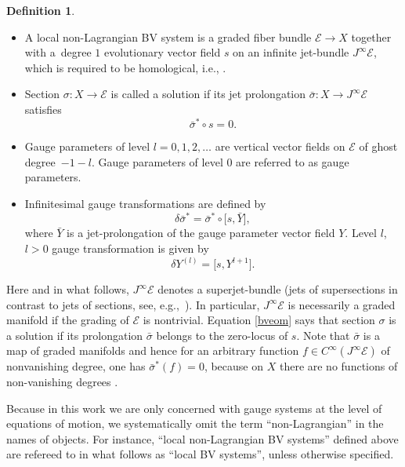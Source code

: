 \documentclass[10pt,a4paper]{amsart}
\numberwithin{equation}{section}
\theoremstyle{definition}
\newtheorem{Definition}[Theorem]{Definition}
\newcommand{\commut}[2]{[#1{,}\,#2]}
\newcommand{\half}{\mathchoice{%
 \ffrac{1}{2}}{\frac{1}{2}}{\frac{1}{2}}{\frac{1}{2}}}
\newcommand{\ffrac}[2]{\raisebox{.5pt}%
 {\footnotesize$\displaystyle\frac{#1}{#2}$}\kern1pt}
\def\cE{\mathcal{E}}
\begin{document}
\begin{Definition}%
\quad
\begin{itemize}\itemsep=0pt
\item
 A local non-Lagrangian BV system is a graded fiber bundle $\mathcal{E}\rightarrow X$ together with a~degree $1$ evolutionary vector field $s$ on an infinite jet-bundle $J^{\infty}\mathcal{E}$, which is required to be homological, i.e., \smash{$s^2=\half\commut{s}{s}=0$}.

 \item Section $\sigma\colon X\rightarrow \mathcal{E}$ is called a solution if its jet prolongation $\bar{\sigma}\colon X\rightarrow J^{\infty}\mathcal{E}$ satisfies
 \begin{equation}\label{bveom}
 \bar{\sigma}^*\circ s=0.
 \end{equation}

\item Gauge parameters of level $l=0,1,2,\dots$ are vertical vector fields on $\mathcal{E}$ of ghost degree~${-1-l}$. Gauge parameters of level $0$ are referred to as gauge parameters.

\item Infinitesimal gauge transformations are defined by
 \begin{equation*}%
 \delta\bar{\sigma}^*=\bar{\sigma}^*\circ\bigl[s, \bar Y\bigr],
 \end{equation*}
 where $\bar{Y}$ is a jet-prolongation of the gauge parameter vector field $Y$. Level $l$, $l>0$ gauge transformation is given by
 \begin{equation*}
 \delta Y^{(l)}=\bigl[s,Y^{l+1}\bigr].
 \end{equation*}
\end{itemize}
\end{Definition}
Here and in what follows, $J^{\infty}\cE$ denotes a superjet-bundle (jets of supersections in contrast to jets of sections, see, e.g.,~\cite{bonavolonta2013}). In particular, $J^{\infty}\cE$ is necessarily a graded manifold if the grading of $\cE$ is nontrivial. Equation \eqref{bveom} says that section $\sigma$ is a solution if its prolongation $\bar\sigma$ belongs to the zero-locus of $s$. Note that $\bar{\sigma}$ is a map of graded manifolds and hence for an arbitrary function $f\in C^{\infty}(J^{\infty}\mathcal{E})$ of nonvanishing degree, one has $\bar{\sigma}^*(f)=0$, because on $X$ there are no functions of non-vanishing degrees .

Because in this work we are only concerned with gauge systems at the level of equations of motion, we systematically omit the term ``non-Lagrangian'' in the names of objects. For instance, ``local non-Lagrangian BV systems'' defined above are refereed to in what follows as ``local BV systems'', unless otherwise specified.
\end{document}
